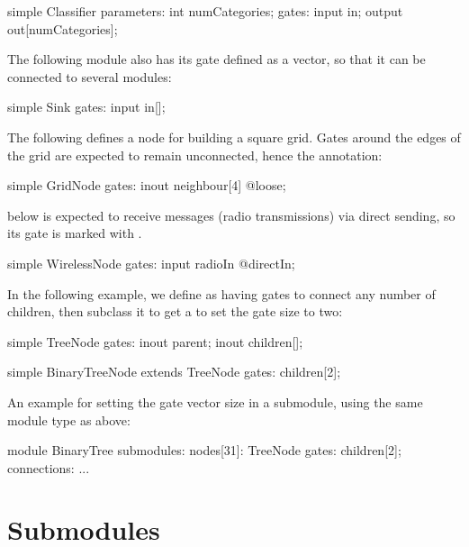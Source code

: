 \begin{ned}
simple Classifier {
    parameters:
        int numCategories;
    gates:
        input in;
        output out[numCategories];
}
\end{ned}

The following  module also has its  gate defined
as a vector, so that it can be connected to several modules:

\begin{ned}
simple Sink {
    gates:
        input in[];
}
\end{ned}

The following defines a node for building a square grid. Gates around the edges of the grid are
expected to remain unconnected, hence the  annotation:

\begin{ned}
simple GridNode {
    gates:
        inout neighbour[4] @loose;
}
\end{ned}

 below is expected to receive messages (radio transmissions)
via direct sending, so its  gate is marked with .

\begin{ned}
simple WirelessNode {
    gates:
        input radioIn @directIn;
}
\end{ned}

In the following example, we define  as having gates to connect
any number of children, then subclass it to get a  to
set the gate size to two:

\begin{ned}
simple TreeNode {
    gates:
        inout parent;
        inout children[];
}

simple BinaryTreeNode extends TreeNode {
    gates:
        children[2];
}
\end{ned}

An example for setting the gate vector size in a submodule, using the same
 module type as above:

\begin{ned}
module BinaryTree {
    submodules:
        nodes[31]: TreeNode {
            gates:
                children[2];
        }
    connections:
        ...
}
\end{ned}



\section{Submodules}
\label{sec:ch-ned-lang:submodules}

